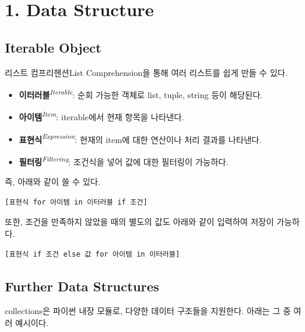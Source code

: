 \section[1. Data Structure - {\it 데이터구조}]{1. Data Structure}
\subsection{Iterable Object}

리스트 컴프리헨션List Comprehension을 통해 여러 리스트를 쉽게 만들 수 있다.

\begin{itemize}
\item \textbf{이터러블}\textit{\textsuperscript{Iterable}}: 순회 가능한 객체로 list, tuple, string 등이 해당된다.
\item \textbf{아이템}\textit{\textsuperscript{Item}}: iterable에서 현재 항목을 나타낸다.
\item \textbf{표현식}\textit{\textsuperscript{Expression}}: 현재의 item에 대한 연산이나 처리 결과를 나타낸다.
\item \textbf{필터링}\textit{\textsuperscript{Filtering}}: 조건식을 넣어 값에 대한 필터링이 가능하다.
\end{itemize}

즉, 아래와 같이 쓸 수 있다.
\begin{tcolorbox}[colframe=black, colback=white]
\begin{verbatim}
[표현식 for 아이템 in 이터러블 if 조건]
\end{verbatim}
\end{tcolorbox}

또한, 조건을 만족하지 않았을 때의 별도의 값도 아래와 같이 입력하여 저장이 가능하다.
\begin{tcolorbox}[colframe=black, colback=white]
\begin{verbatim}
[표현식 if 조건 else 값 for 아이템 in 이터러블]
\end{verbatim}
\end{tcolorbox}

\subsection{Further Data Structures}

collections은 파이썬 내장 모듈로, 다양한 데이터 구조들을 지원한다. 아래는 그 중 여러 예시이다.


